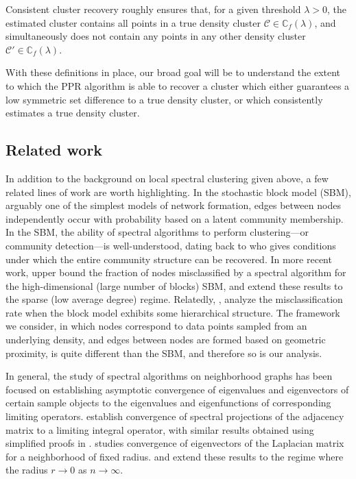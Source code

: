 \documentclass[11pt,twoside]{article}
\theoremstyle{definition}
\newcommand{\1}{\mathbbm{1}}
\newcommand{\Cbb}{\mathbb{C}}
\newcommand{\Cset}{\mathcal{C}}
\newcommand{\Cest}{\widehat{C}}
\begin{document}
Consistent cluster recovery roughly ensures that, for a given 
threshold $\lambda>0$, the estimated cluster \smash{$\Cest$} contains all points
in a true density cluster $\Cset \in \Cbb_f(\lambda)$, and simultaneously does 
not contain any points in any other density cluster $\Cset' \in
\Cbb_f(\lambda)$. 

With these definitions in place, our broad goal will be to understand the extent
to which the PPR algorithm is able to recover a cluster which either guarantees
a low symmetric set difference to a true density cluster, or which consistently
estimates a true density cluster.

\subsection{Related work}

In addition to the background on local spectral clustering given above, a
few related lines of work are worth highlighting. In the stochastic block model
(SBM), arguably one of the simplest models of network formation, edges between
nodes independently occur with probability based on a latent community
membership. In the SBM, the ability of spectral algorithms to perform
clustering---or community detection---is well-understood, dating 
back to \citet{mcsherry2001} who gives conditions under which the entire
community structure can be recovered. In more recent work, \citet{rohe2011}
upper bound the fraction of nodes misclassified by a spectral algorithm for the
high-dimensional (large number of blocks) SBM, and \citet{lei2015} extend these
results to the sparse (low average degree) regime. Relatedly,
\citet{clauset08,balakrishnan2011,li2018}, analyze the misclassification rate
when the block model exhibits some hierarchical structure. The framework we
consider, in which nodes correspond to data points sampled from an underlying 
density, and edges between nodes are formed based on geometric proximity, is
quite different than the SBM, and therefore so is our analysis.

In general, the study of spectral algorithms on neighborhood graphs has been
focused on establishing asymptotic convergence of eigenvalues and eigenvectors
of certain sample objects to the eigenvalues and eigenfunctions of corresponding
limiting operators. \citet{koltchinskii2000} establish convergence of spectral
projections of the adjacency matrix to a limiting integral operator, with
similar results obtained using simplified proofs in
\citet{rosasco10}. \citet{vonluxburg2008} studies convergence of eigenvectors of
the Laplacian matrix for a neighborhood of fixed radius. \citet{belkin07} and
\citet{garciatrillos18} extend these results to the regime where the radius $r
\to 0$ as $n \to \infty$.
\end{document}
